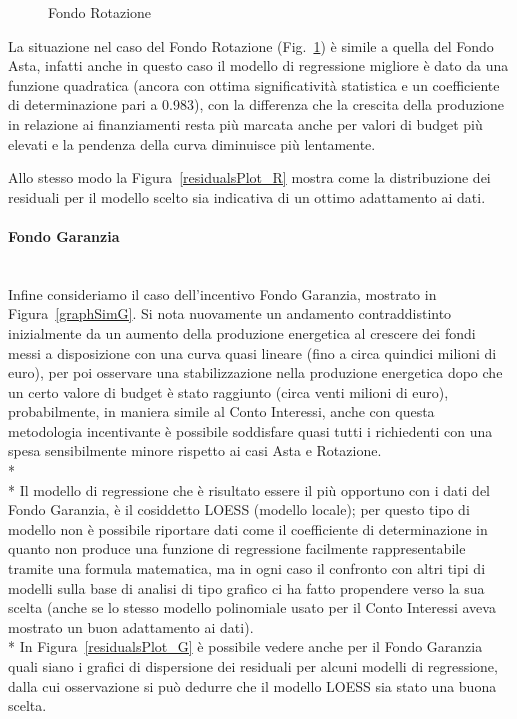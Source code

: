 \documentclass[12pt,a4paper,openright,twoside]{report}
\newcommand{\myparagraph}[1]{\paragraph{#1}\mbox{}\\}
\begin{document}
\begin{figure}[H]
	\centering
	\qquad
	\caption{Fondo Rotazione}
	\label{graphSimR}
\end{figure}

La situazione nel caso del Fondo Rotazione (Fig.~\ref{graphSimR}) è simile a quella del Fondo Asta, infatti anche in questo caso il modello di regressione migliore è dato da una funzione quadratica (ancora con ottima significatività statistica e un coefficiente di determinazione pari a 0.983), con la differenza che la crescita della produzione in relazione ai finanziamenti resta più marcata anche per valori di budget più elevati e la pendenza della curva diminuisce più lentamente.

Allo stesso modo la Figura~\ref{residualsPlot_R} mostra come la distribuzione dei residuali per il modello scelto sia indicativa di un ottimo adattamento ai dati.

\myparagraph{Fondo Garanzia}

Infine consideriamo il caso dell'incentivo Fondo Garanzia, mostrato in Figura~\ref{graphSimG}. Si nota nuovamente un andamento contraddistinto inizialmente da un aumento della produzione energetica al crescere dei fondi messi a disposizione con una curva quasi lineare (fino a circa quindici milioni di euro), per poi osservare una stabilizzazione nella produzione energetica dopo che un certo valore di budget è stato raggiunto (circa venti milioni di euro), probabilmente, in maniera simile al Conto Interessi, anche con questa metodologia incentivante è possibile soddisfare quasi tutti i richiedenti con una spesa sensibilmente minore rispetto ai casi Asta e Rotazione.\\*\\*
Il modello di regressione che è risultato essere il più opportuno con i dati del Fondo Garanzia, è il cosiddetto LOESS (modello locale); per questo tipo di modello non è possibile riportare dati come il coefficiente di determinazione in quanto non produce una funzione di regressione facilmente rappresentabile tramite una formula matematica, ma in ogni caso il confronto con altri tipi di modelli sulla base di analisi di tipo grafico ci ha fatto propendere verso la sua scelta (anche se lo stesso modello polinomiale usato per il Conto Interessi aveva mostrato un buon adattamento ai dati).\\*
In Figura~\ref{residualsPlot_G} è possibile vedere anche per il Fondo Garanzia quali siano i grafici di dispersione dei residuali per alcuni modelli di regressione, dalla cui osservazione si può dedurre che il modello LOESS sia stato una buona scelta.
\end{document}
